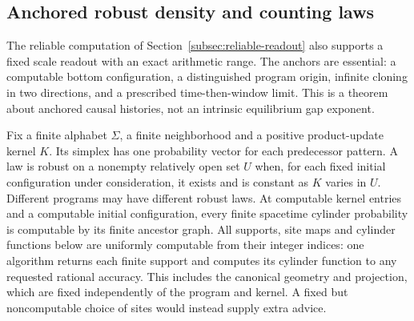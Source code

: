 \subsection{Anchored robust density and counting laws}
\label{subsec:robust-laws}
The reliable computation of Section~\ref{subsec:reliable-readout}
also supports a fixed scale readout with an exact arithmetic range.
The anchors are essential: a computable bottom configuration, a
distinguished program origin, infinite cloning in two directions,
and a prescribed time-then-window limit. This is a theorem about
anchored causal histories, not an intrinsic equilibrium gap exponent.

Fix a finite alphabet $\Sigma$, a finite neighborhood and a
positive product-update kernel $K$. Its simplex has one probability
vector for each predecessor pattern. A law is robust on a nonempty
relatively open set $U$ when, for each fixed initial configuration
under consideration, it exists and is constant as $K$ varies in $U$.
Different programs may have different robust laws. At computable
kernel entries and a computable initial configuration, every finite
spacetime cylinder probability is computable by its finite ancestor
graph. All supports, site maps and cylinder functions below are
uniformly computable from their integer indices: one algorithm returns
each finite support and computes its cylinder function to any requested
rational accuracy. This includes the canonical geometry and projection,
which are fixed independently of the program and kernel. A fixed but
noncomputable choice of sites would instead supply extra advice.

